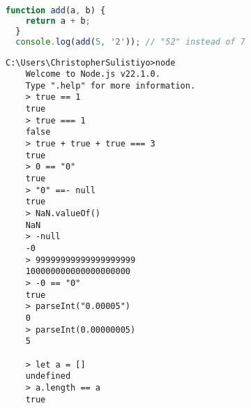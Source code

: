 \begin{lstlisting}[language=JavaScript, caption={Example of challenges in JavaScript because of its loosely typed nature that creates lack of type safety, type coercion, and type conversion}]
  function add(a, b) {
    return a + b;
  }
  console.log(add(5, '2')); // "52" instead of 7
\end{lstlisting}

\begin{lstlisting}[language=DOS, caption={Another example of JavaScript challenges}]
    C:\Users\ChristopherSulistiyo>node
    Welcome to Node.js v22.1.0.
    Type ".help" for more information.
    > true == 1
    true
    > true === 1
    false
    > true + true + true === 3
    true
    > 0 == "0"
    true
    > "0" ==- null
    true
    > NaN.valueOf()
    NaN
    > -null
    -0
    > 99999999999999999999
    100000000000000000000
    > -0 == "0"
    true
    > parseInt("0.00005")
    0
    > parseInt(0.00000005)
    5

    > let a = []
    undefined
    > a.length == a
    true
  \end{lstlisting}
